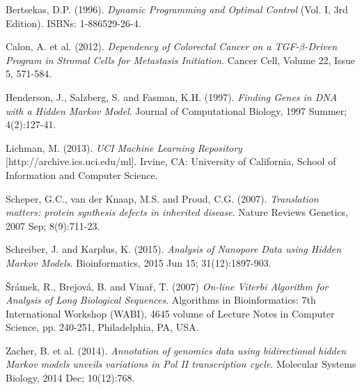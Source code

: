\documentclass[a4paper, 11pt]{article} %
\begin{document}
\begin{thebibliography}{9}

Bertsekas, D.P. (1996).
\textit{Dynamic Programming and Optimal Control} (Vol. I, 3rd Edition). ISBNs: 1-886529-26-4.

Calon, A. et al. (2012).
\textit{Dependency of Colorectal Cancer on a TGF-$\beta$-Driven Program in Stromal Cells for Metastasis Initiation}.
Cancer Cell, Volume 22, Issue 5, 571-584.

Henderson, J., Salzberg, S. and Fasman, K.H. (1997).
\textit{Finding Genes in DNA with a Hidden Markov Model}.
Journal of Computational Biology, 1997 Summer; 4(2):127-41.

Lichman, M. (2013).
\textit{UCI Machine Learning Repository} [http://archive.ics.uci.edu/ml]. Irvine, CA: University of California, School of Information and Computer Science.

Scheper, G.C., van der Knaap, M.S. and Proud, C.G. (2007).
\textit{Translation matters: protein synthesis defects in inherited disease}.
Nature Reviews Genetics, 2007 Sep; 8(9):711-23.

Schreiber, J. and Karplus, K. (2015).
\textit{Analysis of Nanopore Data using Hidden Markov Models}.
Bioinformatics, 2015 Jun 15; 31(12):1897-903.

\v{S}r\'amek, R., Brejov\'a, B. and Vina\v{r}, T. (2007)
\textit{On-line Viterbi Algorithm for Analysis of Long Biological Sequences}.
Algorithms in Bioinformatics: 7th International Workshop (WABI), 4645 volume of Lecture Notes in Computer Science, pp. 240-251, Philadelphia, PA, USA.

Zacher, B. et al. (2014).
\textit{Annotation of genomics data using bidirectional hidden Markov models unveils variations in Pol II transcription cycle}.
Molecular Systems Biology, 2014 Dec; 10(12):768. 

\end{thebibliography}
\end{document}
